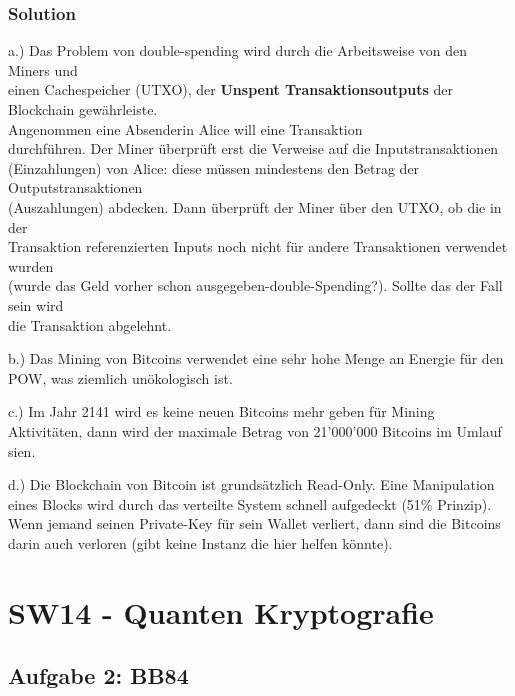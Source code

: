 \documentclass[11pt]{article}
\begin{document}
\hypertarget{solution}{%
\subsubsection{Solution}\label{solution}}

a.) Das Problem von double-spending wird durch die Arbeitsweise von den
Miners und\\
einen Cachespeicher (UTXO), der \textbf{Unspent Transaktionsoutputs} der
Blockchain gewährleiste.\\
Angenommen eine Absenderin Alice will eine Transaktion\\
durchführen. Der Miner überprüft erst die Verweise auf die
Inputstransaktionen\\
(Einzahlungen) von Alice: diese müssen mindestens den Betrag der
Outputstransaktionen\\
(Auszahlungen) abdecken. Dann überprüft der Miner über den UTXO, ob die
in der\\
Transaktion referenzierten Inputs noch nicht für andere Transaktionen
verwendet wurden\\
(wurde das Geld vorher schon ausgegeben-double-Spending?). Sollte das
der Fall sein wird\\
die Transaktion abgelehnt.

b.) Das Mining von Bitcoins verwendet eine sehr hohe Menge an Energie
für den POW, was ziemlich unökologisch ist.

c.) Im Jahr 2141 wird es keine neuen Bitcoins mehr geben für Mining
Aktivitäten, dann wird der maximale Betrag von 21'000'000 Bitcoins im
Umlauf sien.

d.) Die Blockchain von Bitcoin ist grundsätzlich Read-Only. Eine
Manipulation eines Blocks wird durch das verteilte System schnell
aufgedeckt (51\% Prinzip). Wenn jemand seinen Private-Key für sein
Wallet verliert, dann sind die Bitcoins darin auch verloren (gibt keine
Instanz die hier helfen könnte).

\newpage    

    \hypertarget{sw14---quanten-kryptografie}{%
\section{SW14 - Quanten
Kryptografie}\label{sw14---quanten-kryptografie}}

    \hypertarget{aufgabe-2-bb84}{%
\subsection{Aufgabe 2: BB84}\label{aufgabe-2-bb84}}
\end{document}
